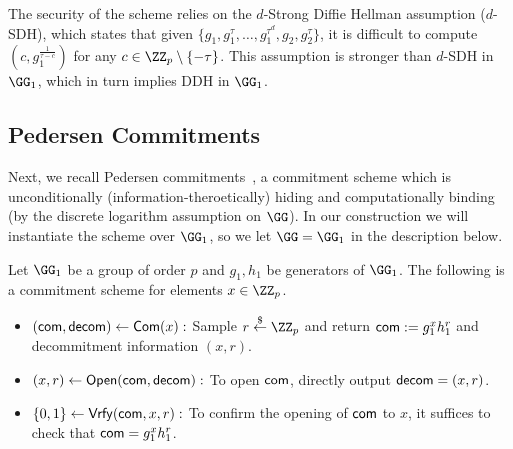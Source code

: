 
The security of the scheme relies on the $d$-Strong Diffie Hellman assumption ($d$-SDH), which states that given $\{g_1, g_1^\tau, \dots, g_1^{\tau^d}, g_2, g_2^\tau\}$, it is difficult to compute $(c, g_1^{\frac{1}{\tau-c}})$ for any $c \in \ZZ_p \setminus \{-\tau\}$. This assumption is stronger than $d$-SDH in $\GG_1$, which in turn implies DDH in $\GG_1$.

\subsection{Pedersen Commitments}\label{sec:pedersen}

Next, we recall Pedersen commitments~\cite{C:Pedersen91}, a commitment scheme which is unconditionally (information-theroetically) hiding and computationally binding (by the discrete logarithm assumption on $\GG$). In our construction we will instantiate the scheme over $\GG_1$, so we let $\GG = \GG_1$ in the description below.

\begin{construction}
Let $\GG_1$ be a group of order $p$ and $g_1,h_1$ be generators of $\GG_1$. The following is a commitment scheme for elements $x \in \ZZ_p$.
\begin{itemize}
    \item \underline{$(\mathsf{com}, \mathsf{decom}) \gets \mathsf{Com}(x):$} Sample $r \sample \ZZ_p$ and return $\mathsf{com} := g_1^x h_1^r$ and decommitment information $(x, r)$.
    \item \underline{$(x, r) \gets \mathsf{Open}(\mathsf{com}, \mathsf{decom}):$} To open $\mathsf{com}$, directly output $\mathsf{decom} = (x, r)$.
    \item \underline{$\{0,1\} \gets \mathsf{Vrfy}(\mathsf{com}, x, r):$} To confirm the opening of $\mathsf{com}$ to $x$, it suffices to check that $\mathsf{com} = g_1^x h_1^r$.
\end{itemize}
\end{construction}

